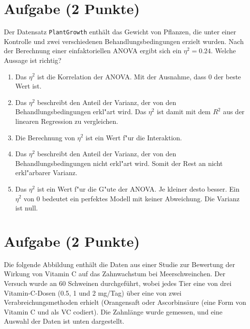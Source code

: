 \documentclass[a4paper, 10pt]{scrartcl}\usepackage[]{graphicx}\usepackage[]{xcolor}
\begin{document}
\section{Aufgabe \hfill (2 Punkte)}



Der Datensatz \texttt{PlantGrowth} enth{\"a}lt das Gewicht von Pflanzen, die
unter einer Kontrolle und zwei verschiedenen Behandlungsbedingungen erzielt
wurden. Nach der Berechnung einer einfaktoriellen ANOVA ergibt sich ein
$\eta^2 = 0.24$. Welche Aussage ist richtig?



\begin{enumerate}
\item [\textbf{A} \msquare] Das $\eta^2$ ist die Korrelation der ANOVA. Mit der Ausnahme, dass 0 der beste Wert ist.
\item [\textbf{B} \msquare] Das $\eta^2$ beschreibt den Anteil der Varianz, der von den Behandlungsbedingungen erkl{"a}rt wird. Das $\eta^2$ ist damit mit dem $R^2$ aus der linearen Regression zu vergleichen.
\item [\textbf{C} \msquare] Die Berechnung von $\eta^2$ ist ein Wert f{"u}r die Interaktion.
\item [\textbf{D} \msquare] Das $\eta^2$ beschreibt den Anteil der Varianz, der von den Behandlungsbedingungen nicht erkl{"a}rt wird. Somit der Rest an nicht erkl{"a}rbarer Varianz.
\item [\textbf{E} \msquare] Das $\eta^2$ ist ein Wert f{"u}r die G{"u}te der ANOVA. Je kleiner desto besser. Ein $\eta^2$ von 0 bedeutet ein perfektes Modell mit keiner Abweichung. Die Varianz ist null.
\end{enumerate} 

\section{Aufgabe \hfill (2 Punkte)}

Die folgende Abbildung enth{\"a}lt die Daten aus einer Studie zur
Bewertung der Wirkung von Vitamin C auf das Zahnwachstum bei
Meerschweinchen. Der Versuch wurde an 60 Schweinen durchgef{\"u}hrt, wobei
jedes Tier eine von drei Vitamin-C-Dosen (0.5, 1 und 2 mg/Tag) {\"u}ber eine
von zwei Verabreichungsmethoden erhielt (Orangensaft oder Ascorbins{\"a}ure
(eine Form von Vitamin C und als VC codiert). Die Zahnl{\"a}nge wurde gemessen,
und eine Auswahl der Daten ist unten dargestellt.
\end{document}
